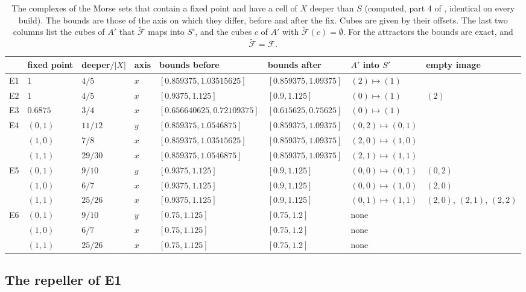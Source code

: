 \documentclass[11pt]{article}
\theoremstyle{plain}
\theoremstyle{definition}
\theoremstyle{remark}
\newcommand{\Fc}{\mathcal{F}}
\newcommand{\Ft}{\tilde{\mathcal{F}}}
\begin{document}
\begin{table}[tbp]
\centering
\caption{The complexes of the Morse sets that contain a fixed point and have a cell of $X$ deeper than $S$ (computed, part 4 of , identical on every build). The bounds are those of the axis on which they differ, before and after the fix. Cubes are given by their offsets. The last two columns list the cubes of $A'$ that $\Ft$ maps into $S'$, and the cubes $c$ of $A'$ with $\Ft(c)=\emptyset$. For the attractors the bounds are exact, and $\Ft=\Fc$.}\label{tab:complexes}
\footnotesize
\setlength{\tabcolsep}{4pt}
\begin{tabular}{llllllll}
\toprule
 & fixed point & deeper$/|X|$ & axis & bounds before & bounds after & $A'$ into $S'$ & empty image \\
\midrule
E1 & $1$ & $4/5$ & $x$ & $[0.859375,1.03515625]$ & $[0.859375,1.09375]$ & $(2)\mapsto(1)$ & \\
E2 & $1$ & $4/5$ & $x$ & $[0.9375,1.125]$ & $[0.9,1.125]$ & $(0)\mapsto(1)$ & $(2)$ \\
E3 & $0.6875$ & $3/4$ & $x$ & $[0.656640625,0.72109375]$ & $[0.615625,0.75625]$ & $(0)\mapsto(1)$ & \\
E4 & $(0,1)$ & $11/12$ & $y$ & $[0.859375,1.0546875]$ & $[0.859375,1.09375]$ & $(0,2)\mapsto(0,1)$ & \\
 & $(1,0)$ & $7/8$ & $x$ & $[0.859375,1.03515625]$ & $[0.859375,1.09375]$ & $(2,0)\mapsto(1,0)$ & \\
 & $(1,1)$ & $29/30$ & $x$ & $[0.859375,1.0546875]$ & $[0.859375,1.09375]$ & $(2,1)\mapsto(1,1)$ & \\
E5 & $(0,1)$ & $9/10$ & $y$ & $[0.9375,1.125]$ & $[0.9,1.125]$ & $(0,0)\mapsto(0,1)$ & $(0,2)$ \\
 & $(1,0)$ & $6/7$ & $x$ & $[0.9375,1.125]$ & $[0.9,1.125]$ & $(0,0)\mapsto(1,0)$ & $(2,0)$ \\
 & $(1,1)$ & $25/26$ & $x$ & $[0.9375,1.125]$ & $[0.9,1.125]$ & $(0,1)\mapsto(1,1)$ & $(2,0)$, $(2,1)$, $(2,2)$ \\
E6 & $(0,1)$ & $9/10$ & $y$ & $[0.75,1.125]$ & $[0.75,1.2]$ & none & \\
 & $(1,0)$ & $6/7$ & $x$ & $[0.75,1.125]$ & $[0.75,1.2]$ & none & \\
 & $(1,1)$ & $25/26$ & $x$ & $[0.75,1.125]$ & $[0.75,1.2]$ & none & \\
\bottomrule
\end{tabular}
\end{table}

\subsection{The repeller of E1}\label{sec:e1}
\end{document}

